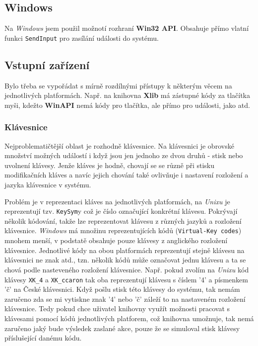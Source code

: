 \documentclass[12pt]{article}
\newcommand{\code}[1]{\texttt{#1}}
\begin{document}
    \subsection{Windows}
    Na \emph{Windows} jsem použil možnotí rozhraní \textbf{Win32 API}. Obsahuje přímo vlatní funkci \code{SendInput} pro zasílání události do systému.

    \subsection{Vstupní zařízení}
    Bylo třeba se vypořádat s mírně rozdílnými přístupy k některým věcem na jednotlivých platformách. Např. na knihovna \textbf{Xlib} má zástupné kódy za tlačítka myši, kdežto \textbf{WinAPI} nemá kódy pro tlačítka, ale přímo pro události, jako  atd.

    \subsubsection{Klávesnice}
    Nejproblematičtější oblast je rozhodně klávesnice. Na klávesnici je obrovské množství možných událostí i když jsou jen jednoho ze dvou druhů - stisk nebo uvolnení klávesy. Jenže kláves je hodně, chovají se se různě při stisku modifikačních kláves a navíc jejich chování také ovlivňuje i nastavení rozložení a jazyka klávesnice v systému.
    
    Problém je v reprezentaci kláves na jednotlivých platformách, na \emph{Unixu} je reprezentují tzv. \code{KeySym}y což je číslo označující konkrétní klávesu. Pokrývají několik kódování, takže lze reprezentovat klávesu z různých jazyků a rozložení klávesnice. \emph{Windows} má množinu reprezentujících kódů (\code{Virtual-Key codes}) mnohem menší, v podstatě obsahuje pouze klávesy z anglického rozložení klávesnice. Jednotlivé kódy na obou platformách reprezentují stejně klávesu na klávesnici ne znak atd., tzn. několik kódů může označovat jednu klávesu a ta se chová podle nasteveného rozložení klávesnice. Např. pokud zvolím na \emph{Unixu} kód klávesy \code{XK\_4} a \code{XK\_ccaron} tak oba reprezentují klávesu s číslem '4' a písmenkem 'č' na České klávesnici. Když pošlu stisk této klávesy do systému, tak nemám zaručeno zda se mi vytiskne znak '4' nebo 'č' záleží to na nastaveném rozložení klávesnice. Tedy pokud chce uživatel knihovny využít možnosti pracovat s klávesami pomocí kódů jednotlivých platforem, což knihovna umožnuje, tak nemá zaručeno jaký bude výsledek zaslané akce, pouze že se simuloval stisk klávesy příslušející danému kódu.
    
\end{document}
